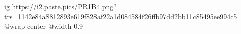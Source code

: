  
 
 
 
 

\ifcmt
  ig https://i2.paste.pics/PR1B4.png?trs=1142e84a8812893e619f828af22a1d084584f26ffb97dd2bb11c85495ee994c5
  @wrap center
  @width 0.9
\fi
